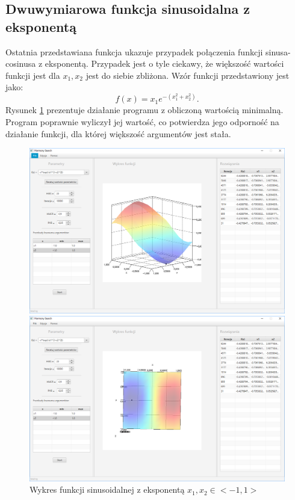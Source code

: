 \documentclass[10pt, a4paper]{article}
\begin{document}
\subsection{Dwuwymiarowa funkcja sinusoidalna z eksponentą}
\label{subsec:sinexp}
Ostatnia przedstawiana funkcja ukazuje przypadek połączenia funkcji sinusa-cosinusa z eksponentą. Przypadek jest o tyle ciekawy, że większość wartości funkcji jest dla {\em $x_{1}, x_{2}$} jest do siebie zbliżona. Wzór funkcji przedstawiony jest jako: $$f(x)=x_{1}e^{-(x_{1}^{2}+x_{2}^2)}.$$ Rysunek \ref{fig:9} prezentuje działanie programu z obliczoną wartością minimalną. Program poprawnie wyliczył jej wartość, co potwierdza jego odporność na działanie funkcji, dla której większość argumentów jest stała. 
\begin{figure}[htbp] 
	\begin{minipage}[b]{1\textwidth}
		\centering
		\includegraphics[width=\linewidth]{images/91.PNG}
	\end{minipage} 
	\begin{minipage}[b]{1\textwidth}
		\centering
		\includegraphics[width=\linewidth]{images/92.PNG} 
	\end{minipage}
	\label{fig:9}
	\caption{Wykres funkcji sinusoidalnej z eksponentą $x_{1}, x_{2} \in <-1,1>$}
\end{figure}
\end{document}
